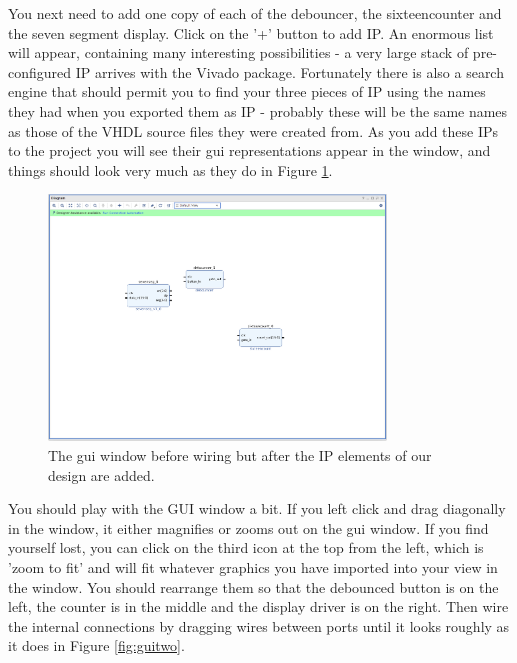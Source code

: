 \documentclass[../physical_computing.tex]{subfiles}
\begin{document}
You next need to add one copy of each of the debouncer, the sixteencounter and the seven segment display. Click on the '+' button to add IP. An enormous list will appear, containing many interesting possibilities - a very large stack of pre-configured IP arrives with the Vivado package. Fortunately there is also a search engine that should permit you to find your three pieces of IP using the names they had when you exported them as IP - probably these will be the same names as those of the VHDL source files they were created from. As you add these IPs to the project you 
will see their gui representations appear in the window, and things should look very much as they do in Figure \ref{fig:guione}.

\begin{figure}[htbp]
    \centering
    \includegraphics[width=0.8\textwidth]{appendix_5/figures/guione.png}
    \caption{The gui window before wiring but after the IP elements of our design are added.}
    \label{fig:guione}
\end{figure}

You should play with the GUI window a bit. If you left click and drag diagonally in the window, it either magnifies or zooms out on the gui window. If you find yourself lost, you can click on the third icon at the top from the left, which is 'zoom to fit' and will fit whatever graphics you have imported into your view in the window. You should rearrange them so that the debounced button is on the left, the counter is in the middle and the display driver is on the right. Then wire the internal connections by dragging wires between ports until it looks roughly as it does in Figure \ref{fig:guitwo}.
\end{document}
